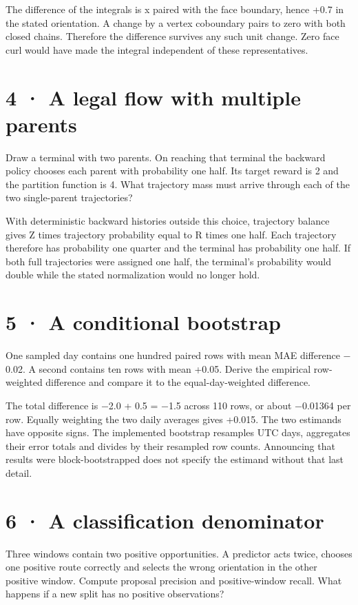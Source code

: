 \documentclass[11pt,oneside,openany]{book}
\begin{document}
The difference of the integrals is x paired with the face boundary, hence +0.7 in the stated orientation. A change by a vertex coboundary pairs to zero with both closed chains. Therefore the difference survives any such unit change. Zero face curl would have made the integral independent of these representatives.

\section*{4 · A legal flow with multiple parents}
Draw a terminal with two parents. On reaching that terminal the backward policy chooses each parent with probability one half. Its target reward is 2 and the partition function is 4. What trajectory mass must arrive through each of the two single-parent trajectories?

With deterministic backward histories outside this choice, trajectory balance gives Z times trajectory probability equal to R times one half. Each trajectory therefore has probability one quarter and the terminal has probability one half. If both full trajectories were assigned one half, the terminal's probability would double while the stated normalization would no longer hold.

\section*{5 · A conditional bootstrap}
One sampled day contains one hundred paired rows with mean MAE difference \ensuremath{-}0.02. A second contains ten rows with mean +0.05. Derive the empirical row-weighted difference and compare it to the equal-day-weighted difference.

The total difference is \ensuremath{-}2.0 + 0.5 = \ensuremath{-}1.5 across 110 rows, or about \ensuremath{-}0.01364 per row. Equally weighting the two daily averages gives +0.015. The two estimands have opposite signs. The implemented bootstrap resamples UTC days, aggregates their error totals and divides by their resampled row counts. Announcing that results were block-bootstrapped does not specify the estimand without that last detail.

\section*{6 · A classification denominator}
Three windows contain two positive opportunities. A predictor acts twice, chooses one positive route correctly and selects the wrong orientation in the other positive window. Compute proposal precision and positive-window recall. What happens if a new split has no positive observations?
\end{document}
